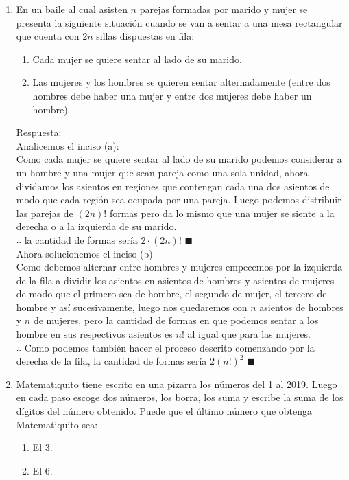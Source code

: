 \documentclass{book}
\begin{document}
\begin{enumerate}
				\item En un baile al cual asisten $n$ parejas formadas por marido y mujer se presenta la siguiente situación cuando se van a sentar a una mesa rectangular que cuenta con $2n$ sillas dispuestas en fila:
					\begin{enumerate}
						\item Cada mujer se quiere sentar al lado de su marido.
						\item Las mujeres y los hombres se quieren sentar alternadamente (entre dos hombres debe haber una mujer y entre dos mujeres debe haber un hombre).
					\end{enumerate}			   
				Respuesta:\\
				Analicemos el inciso (a):\\
				Como cada mujer se quiere sentar al lado de su marido podemos considerar a un hombre y una mujer que sean pareja como una sola unidad, ahora dividamos los asientos en regiones que contengan cada una dos asientos de modo que cada región sea ocupada por una pareja. Luego podemos distribuir las parejas de $(2n)!$ formas pero da lo mismo que una mujer se siente a la derecha o a la izquierda de su marido.\\
				$\therefore$ la cantidad de formas sería $2\cdot(2n)!$ $\blacksquare$\\
				Ahora solucionemos el inciso (b)\\
				Como debemos alternar entre hombres y mujeres empecemos por la izquierda de la fila a dividir los asientos en asientos de hombres y asientos de mujeres de modo que el primero sea de hombre, el segundo de mujer, el tercero de hombre y así sucesivamente, luego nos quedaremos con $n$ asientos de hombres y $n$ de mujeres, pero la cantidad de formas en que podemos sentar a los hombre en sus respectivos asientos es $n!$ al igual que para las mujeres.\\
				$\therefore$ Como podemos también hacer el proceso descrito comenzando por la derecha de la fila, la cantidad de formas sería $2{(n!)}^2$ $\blacksquare$\\
				\item Matematiquito tiene escrito en una pizarra los números del 1 al 2019. Luego en cada paso escoge dos números, los borra, los suma y escribe la suma de los dígitos del número obtenido. Puede que el último número que obtenga Matematiquito sea:
 					\begin{enumerate}
 						\item  El 3. 
 						\item El 6.

\end{enumerate}
\end{enumerate}
\end{document}

